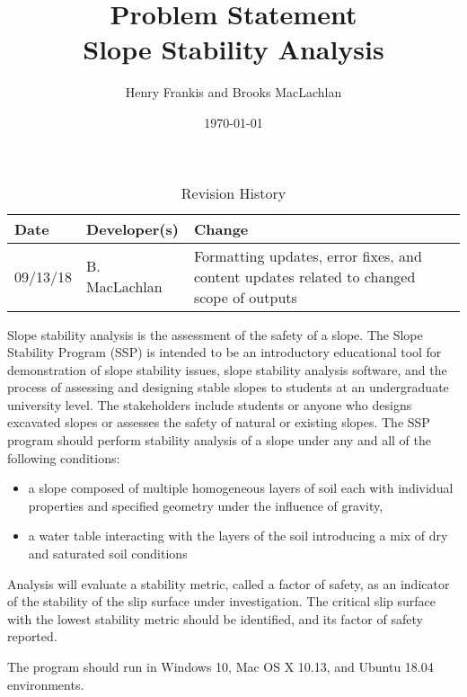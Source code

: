 \documentclass[12pt]{article}
\title{Problem Statement\\Slope Stability Analysis}
\author{Henry Frankis and Brooks MacLachlan}
\date{\today}
\begin{document}
\maketitle

\begin{table}[hp]
	\caption{Revision History} \label{TblRevisionHistory}
	\begin{tabularx}{\textwidth}{llX}
		\toprule
		\textbf{Date} & \textbf{Developer(s)} & \textbf{Change}\\
		\midrule
		09/13/18 & B. MacLachlan & Formatting updates, error fixes, and content updates related to changed scope of outputs\\
		\bottomrule
	\end{tabularx}
\end{table}

Slope stability analysis is the assessment of the safety of a slope. The Slope
Stability Program (SSP) is intended to be an introductory educational tool for
demonstration of slope stability issues, slope stability analysis software, and
the process of assessing and designing stable slopes to students at an
undergraduate university level. The stakeholders include students or anyone who
designs excavated slopes or assesses the safety of natural or existing
slopes. The SSP program should perform stability analysis of a slope under any
and all of the following conditions:

\begin{itemize}
\item {a slope composed of multiple homogeneous layers of soil each with
    individual properties and specified geometry under the influence of
    gravity,}
\item {a water table interacting with the layers of the soil introducing a mix
    of dry and saturated soil conditions}
\end{itemize}

Analysis will evaluate a stability metric, called a factor of safety, as an
indicator of the stability of the slip surface under investigation. The critical
slip surface with the lowest stability metric should be identified, and its
factor of safety reported.

The program should run in Windows 10, Mac OS X 10.13, and Ubuntu 18.04 environments.
\end{document}
